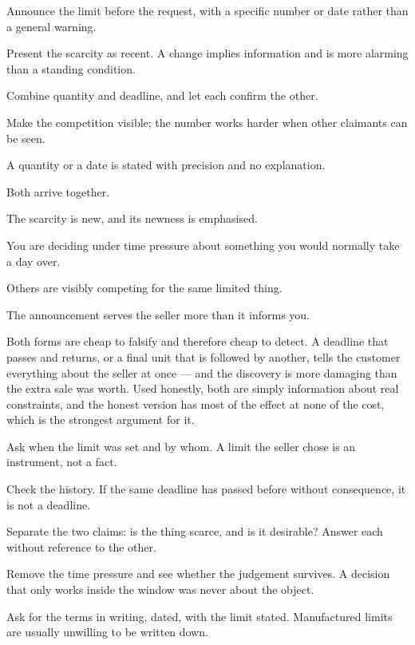 \begin{application}
  \item Announce the limit before the request, with a specific number or date rather than a general warning.
  \item Present the scarcity as recent. A change implies information and is more alarming than a standing condition.
  \item Combine quantity and deadline, and let each confirm the other.
  \item Make the competition visible; the number works harder when other claimants can be seen.
\end{application}

\begin{feedback}
  \item A quantity or a date is stated with precision and no explanation.
  \item Both arrive together.
  \item The scarcity is new, and its newness is emphasised.
  \item You are deciding under time pressure about something you would normally take a day over.
  \item Others are visibly competing for the same limited thing.
  \item The announcement serves the seller more than it informs you.
\end{feedback}

\begin{failure}
Both forms are cheap to falsify and therefore cheap to detect. A deadline that passes and returns, or a final unit that is followed by another, tells the customer everything about the seller at once --- and the discovery is more damaging than the extra sale was worth. Used honestly, both are simply information about real constraints, and the honest version has most of the effect at none of the cost, which is the strongest argument for it.
\end{failure}

\begin{countermeasures}
  \item Ask when the limit was set and by whom. A limit the seller chose is an instrument, not a fact.
  \item Check the history. If the same deadline has passed before without consequence, it is not a deadline.
  \item Separate the two claims: is the thing scarce, and is it desirable? Answer each without reference to the other.
  \item Remove the time pressure and see whether the judgement survives. A decision that only works inside the window was never about the object.
  \item Ask for the terms in writing, dated, with the limit stated. Manufactured limits are usually unwilling to be written down.
\end{countermeasures}

\seesources
{}
